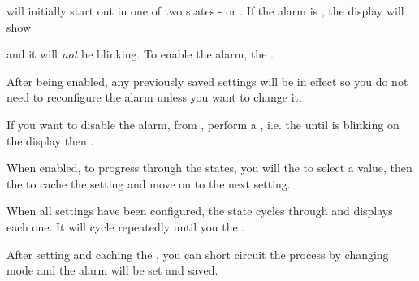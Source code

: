 will initially start out in one of two states -  or .
If the alarm is , the display will show

\begin{figure}[H]
\centering
\end{figure}

and it will \textit{not} be blinking.  To enable the alarm,  the .


After being enabled, any previously saved settings will be in effect so you
do not need to reconfigure the alarm unless you want to change it.

\par\medskip

If you want to disable the alarm, from , perform a , i.e.
 the  until \symD{<<<<} is blinking on the display then .



\par\medskip

When enabled, to progress through the states, you will  the
 to select a value, then  the  to cache the setting and
move on to the next setting.

\tabcolsep=8pt
\tabcolsep=12pt

When all settings have been configured, the  state cycles through and
displays each one.  It will cycle repeatedly until you  the .

\par\medskip

After setting and caching the , you can short circuit the process by
changing mode and the alarm will be set and saved.

\tabcolsep=10pt
\tabcolsep=12pt

